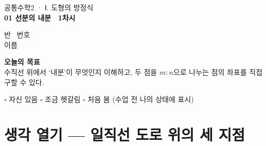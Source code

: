 \documentclass[11pt,a4paper]{article}
\newcommand{\fillblank}[1]{\makebox[#1]{\hrulefill}}
\begin{document}
\noindent
\begin{minipage}[b]{0.62\linewidth}
  {\sffamily\footnotesize\color{indigosoft} 공통수학2 · Ⅰ. 도형의 방정식}\\[2pt]
  {\sffamily\bfseries\Large 01 선분의 내분 \textperiodcentered\ 1차시}
\end{minipage}\hfill
\begin{minipage}[b]{0.36\linewidth}
  \raggedleft\small\color{inksoft}
  반\ \fillblank{1.6cm} \quad 번호\ \fillblank{1.6cm}\\[4pt]
  이름\ \fillblank{3.6cm}
\end{minipage}

\vspace{4pt}
\noindent{\color{goldc}\rule{\linewidth}{2.2pt}}
\vspace{10pt}

\begin{goalbox}
\textbf{오늘의 목표}\\
수직선 위에서 `내분'이 무엇인지 이해하고, 두 점을 $m:n$으로 나누는 점의 좌표를 직접 구할 수 있다.
\vspace{4pt}

\small\color{inksoft}
$\square$ 자신 있음 \quad $\square$ 조금 헷갈림 \quad $\square$ 처음 봄 \hfill (수업 전 나의 상태에 표시)
\end{goalbox}

\section{생각 열기 --- 일직선 도로 위의 세 지점}
\end{document}
